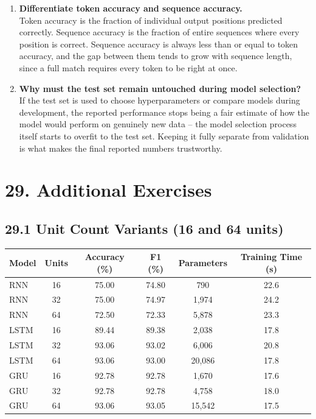 \documentclass[10pt]{article}
\begin{document}
\begin{enumerate}
\item \textbf{Differentiate token accuracy and sequence accuracy.}\\
Token accuracy is the fraction of individual output positions predicted
correctly. Sequence accuracy is the fraction of entire sequences where
every position is correct. Sequence accuracy is always less than or equal
to token accuracy, and the gap between them tends to grow with sequence
length, since a full match requires every token to be right at once.

\item \textbf{Why must the test set remain untouched during model selection?}\\
If the test set is used to choose hyperparameters or compare models during
development, the reported performance stops being a fair estimate of how
the model would perform on genuinely new data -- the model selection
process itself starts to overfit to the test set. Keeping it fully separate
from validation is what makes the final reported numbers trustworthy.

\end{enumerate}

\section*{29. Additional Exercises}

\subsection*{29.1 Unit Count Variants (16 and 64 units)}

\begin{center}
\begin{tabular}{|l|c|c|c|c|c|}
\hline
Model & Units & Accuracy (\%) & F1 (\%) & Parameters & Training Time (s)\\
\hline
RNN & 16 & 75.00 & 74.80 & 790 & 22.6\\
RNN & 32 & 75.00 & 74.97 & 1,974 & 24.2\\
RNN & 64 & 72.50 & 72.33 & 5,878 & 23.3\\
LSTM & 16 & 89.44 & 89.38 & 2,038 & 17.8\\
LSTM & 32 & 93.06 & 93.02 & 6,006 & 20.8\\
LSTM & 64 & 93.06 & 93.00 & 20,086 & 17.8\\
GRU & 16 & 92.78 & 92.78 & 1,670 & 17.6\\
GRU & 32 & 92.78 & 92.78 & 4,758 & 18.0\\
GRU & 64 & 93.06 & 93.05 & 15,542 & 17.5\\
\hline
\end{tabular}
\end{center}
\end{document}
